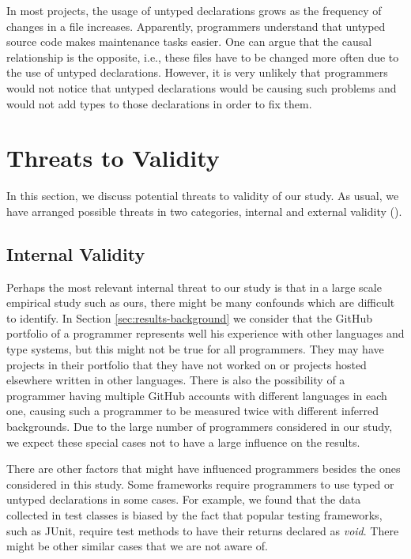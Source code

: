 \documentclass[msc]{ppgccufmg}
\begin{document}
In most projects, the usage of untyped declarations grows as the frequency of changes in a file increases.
Apparently, programmers understand that untyped source code makes maintenance tasks easier.
One can argue that the causal relationship is the opposite, i.e., these files have to be changed more often due to the use of untyped declarations.
However, it is very unlikely that programmers would not notice that untyped declarations would be causing such problems and would not add types to those declarations in order to fix them.


\section{Threats to Validity\label{threats}}
In this section, we discuss potential threats to validity of our study. As usual, we have arranged possible threats in two categories, internal and external validity (\cite{Wohlin2012}). 

\subsection*{Internal Validity}
Perhaps the most relevant internal threat to our study is that in a large scale empirical study such as ours, there might be many confounds which are difficult to identify.
In Section \ref{sec:results-background} we consider that the GitHub portfolio of a programmer represents well his experience with other languages and type systems, but this might not be true for all programmers.
They may have projects in their portfolio that they have not worked on or projects hosted elsewhere written in other languages.
There is also the possibility of a programmer having multiple GitHub accounts with different languages in each one, causing such a programmer to be measured twice with different inferred backgrounds.
Due to the large number of programmers considered in our study, we expect these special cases not to have a large influence on the results.

There are other factors that might have influenced programmers besides the ones considered in this study.
Some frameworks require programmers to use typed or untyped declarations in some cases.
For example, we found that the data collected in test classes is biased by the fact that popular testing frameworks, such as JUnit, require test methods to have their returns declared as \emph{void}.
There might be other similar cases that we are not aware of.
\end{document}
